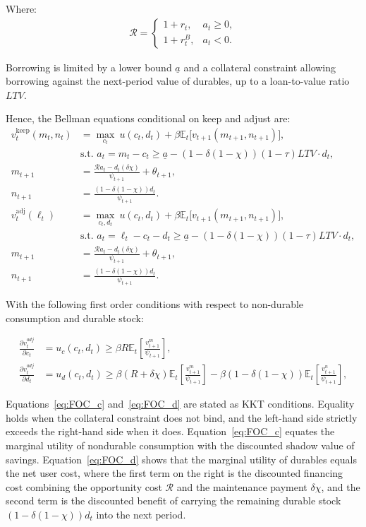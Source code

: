 Where:
	\begin{align}
	\mathcal{R} = 
	\begin{cases}
		1+r_t, & a_t \ge 0,\\
		1+r_t^B, & a_t < 0.
	\end{cases}
\end{align}

Borrowing is limited by a lower bound $\underline{a}$ and a collateral constraint allowing borrowing against the next-period value of durables, up to a loan-to-value ratio $LTV$.

Hence, the Bellman equations conditional on keep and adjust are:
\begin{align}
	v_t^{\text{keep}}(m_t,n_t) &= \max_{c_t} \ u(c_t ,d_t) + \beta \mathbb{E}_t \big[ v_{t+1}(m_{t+1},n_{t+1}) \big],\\
	& \text{s.t. } a_t = m_t - c_t \geq \underline{a} - (1 - \delta(1 - \chi)) (1 - \tau) LTV \cdot d_t,\\
	m_{t+1} &= \frac{\mathcal{R} a_t - d_t (\delta \chi)}{\psi_{t+1}} + \theta_{t+1},\\
	n_{t+1} &= \frac{(1-\delta(1 - \chi))d_t}{\psi_{t+1}}.\\[1em]
	v_t^{\text{adj}}(\ell_t) &= \max_{c_t,d_t} \ u(c_t,d_t) + \beta \mathbb{E}_t \big[ v_{t+1}(m_{t+1},n_{t+1}) \big],\\
	& \text{s.t. } a_t = \ell_t - c_t - d_t \geq \underline{a} - (1 - \delta(1 - \chi)) (1 - \tau) LTV \cdot d_t,\\
	m_{t+1} &= \frac{\mathcal{R} a_t - d_t (\delta \chi)}{\psi_{t+1}} + \theta_{t+1},\\
	n_{t+1} &= \frac{(1-\delta(1 - \chi))d_t}{\psi_{t+1}}.
\end{align}

With the following first order conditions with respect to non-durable consumption and durable stock:

\begin{align}
	\frac{\partial v_t^{adj}}{\partial c_t} &= u_c(c_t, d_t) \geq \beta R \mathbb{E}_t [\frac{v_{t+1}^m}{\psi_{t+1}}], \label{eq:FOC_c} \\
	\frac{\partial v_t^{adj}}{\partial d_t} &= u_d(c_t, d_t) \geq \beta (R + \delta \chi) \mathbb{E}_t[\frac{v_{t+1}^m}{\psi_{t+1}}] -\beta (1 - \delta(1 - \chi)) \mathbb{E}_t[\frac{v_{t+1}^n}{\psi_{t+1}}], \label{eq:FOC_d}
\end{align}

Equations~\ref{eq:FOC_c} and~\ref{eq:FOC_d} are stated as KKT conditions. Equality holds when the collateral constraint does not bind, and the left-hand side strictly exceeds the right-hand side when it does. Equation~\ref{eq:FOC_c} equates the marginal utility of nondurable consumption with the discounted shadow value of savings. Equation~\ref{eq:FOC_d} shows that the marginal utility of durables equals the net user cost, where the first term on the right is the discounted financing cost combining the opportunity cost $\mathcal{R}$ and the maintenance payment $\delta\chi$, and the second term is the discounted benefit of carrying the remaining durable stock $(1-\delta(1-\chi))d_t$ into the next period. 

